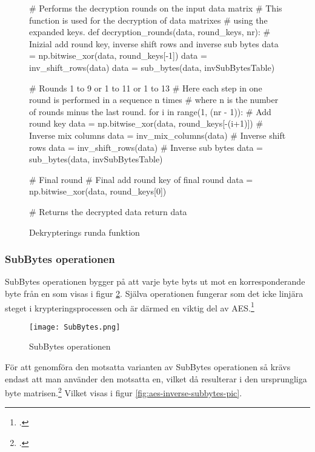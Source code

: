 \begin{figure}[H]
    \centering
    \begin{python}
    # Performs the decryption rounds on the input data matrix
    # This function is used for the decryption of data matrixes
    # using the expanded keys.
    def decryption_rounds(data, round_keys, nr):
        # Inizial add round key, inverse shift rows and inverse sub bytes
        data = np.bitwise_xor(data, round_keys[-1])
        data = inv_shift_rows(data)
        data = sub_bytes(data, invSubBytesTable)

        # Rounds 1 to 9 or 1 to 11 or 1 to 13
        # Here each step in one round is performed in a sequence n times
        # where n is the number of rounds minus the last round.
        for i in range(1, (nr - 1)):
            # Add round key
            data = np.bitwise_xor(data, round_keys[-(i+1)])
            # Inverse mix columns
            data = inv_mix_columns(data)
            # Inverse shift rows
            data = inv_shift_rows(data)
            # Inverse sub bytes
            data = sub_bytes(data, invSubBytesTable)

        # Final round
        # Final add round key of final round
        data = np.bitwise_xor(data, round_keys[0])

        # Returns the decrypted data
        return data

    \end{python}
    \caption{Dekrypterings runda funktion}
    \label{fig:decryption-rounds-function}
\end{figure}

\subsubsection{SubBytes operationen} %
\label{sec:aes-subbytes}
SubBytes operationen bygger på att varje byte byts ut mot en korresponderande \gls{byte} från en  som
visas i figur \ref{fig:aes-subbytes-pic}.
Själva operationen fungerar som det icke linjära steget i krypteringsprocessen och är därmed en viktig del av AES.\footcite{daemen1999aes}

\begin{figure}[H]
    \centering
    \texttt{[image: SubBytes.png]}
    \caption{SubBytes operationen}
    \label{fig:aes-subbytes-pic}
\end{figure}

För att genomföra den motsatta varianten av SubBytes operationen så krävs endast att man använder den motsatta en,
vilket då resulterar i den ursprungliga \gls{byte} matrisen.\footcite{daemen1999aes} Vilket visas i figur \ref{fig:aes-inverse-subbytes-pic}.

